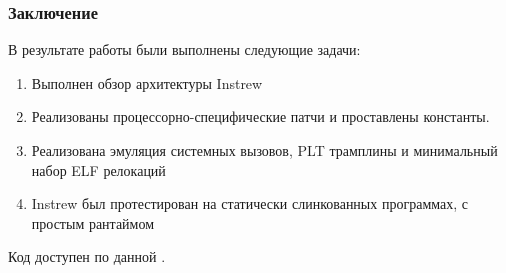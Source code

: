 \documentclass{beamer}
\begin{document}
\begin{frame}
  \frametitle{Заключение}
  В результате работы были выполнены следующие задачи:
  \vspace{8pt}
  \begin{enumerate}
    \item Выполнен обзор архитектуры Instrew
    \item Реализованы процессорно-специфические патчи и проставлены константы.
    \item Реализована эмуляция системных вызовов, PLT трамплины и минимальный набор ELF релокаций
    \item Instrew был протестирован на статически слинкованных программах, с простым рантаймом
  \end{enumerate}
  \vspace{8pt}
    Код доступен по данной \href{https://github.com/aengelke/instrew/compare/master...mikhaylovilya:instrew:host-riscv64}{\color{blue}{ссылке}}.

\end{frame}

\appendix



\end{document}
